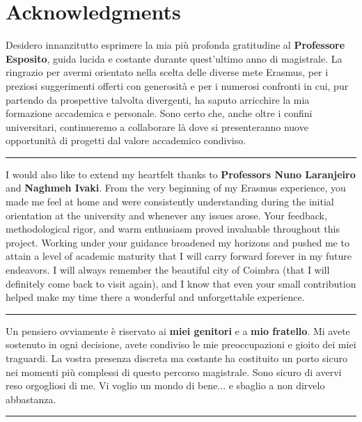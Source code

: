 \chapter*{Acknowledgments}

\begingroup

\setlength{\parindent}{0pt}     
\setlength{\parskip}{6pt plus2pt}
\newcommand{\separator}{
  \par\medskip\hrule\medskip
}

Desidero innanzitutto esprimere la mia più profonda gratitudine al \textbf{Professore Esposito}, guida lucida e costante durante quest’ultimo anno di magistrale. La ringrazio per avermi orientato nella scelta delle diverse mete Erasmus, per i preziosi suggerimenti offerti con generosità e per i numerosi confronti in cui, pur partendo da prospettive talvolta divergenti, ha saputo arricchire la mia formazione accademica e personale. Sono certo che, anche oltre i confini universitari, continueremo a collaborare là dove si presenteranno nuove opportunità di progetti dal valore accademico condiviso.

\separator

I would also like to extend my heartfelt thanks to \textbf{Professors Nuno Laranjeiro} and \textbf{Naghmeh Ivaki}. From the very beginning of my Erasmus experience, you made me feel at home and were consistently understanding during the initial orientation at the university and whenever any issues arose. Your feedback, methodological rigor, and warm enthusiasm proved invaluable throughout this project. Working under your guidance broadened my horizons and pushed me to attain a level of academic maturity that I will carry forward forever in my future endeavors. I will always remember the beautiful city of Coimbra (that I will definitely come back to visit again), and I know that even your small contribution helped make my time there a wonderful and unforgettable experience.

\separator

Un pensiero ovviamente è riservato ai \textbf{miei genitori} e a \textbf{mio fratello}. Mi avete sostenuto in ogni decisione, avete condiviso le mie preoccupazioni e gioito dei miei traguardi. La vostra presenza discreta ma costante ha costituito un porto sicuro nei momenti più complessi di questo percorso magistrale. Sono sicuro di avervi reso orgogliosi di me. Vi voglio un mondo di bene... e sbaglio a non dirvelo abbastanza.

\separator

